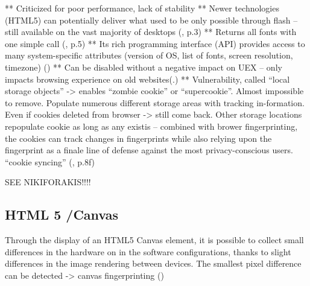 **	Criticized for poor performance, lack of stability
**	Newer technologies (HTML5) can potentially deliver what used to be only possible through flash – still available on the vast majority of desktops (\textcite{nikiforakis13}, p.3)
**	Returns all fonts with one simple call (\textcite{havens16}, p.5)
**	Its rich programming interface (API) provides access to many system-specific attributes (version of OS, list of fonts, screen resolution, timezone) (\textcite{amiunique})
**	Can be disabled without a negative impact on UEX – only impacts browsing experience on old websites(\textcite{pixel18}.)
**	Vulnerability, called “local storage objects” -> enables “zombie cookie” or “supercookie”. Almost impossible to remove. Populate numerous different storage areas with tracking in-formation. Even if cookies deleted from browser -> still come back. Other storage locations repopulate cookie as long as any existis – combined with brower fingerprinting, the cookies can track changes in fingerprints while also relying upon the fingerprint as a finale line of defense against the most privacy-conscious users. “cookie syncing” (\textcite{havens16}, p.8f)

SEE NIKIFORAKIS!!!!

\subsection{HTML 5 /Canvas}
Through the display of an HTML5 Canvas element, it is possible to collect small differences in the hardware on in the software configurations, thanks to slight differences in the image rendering between devices. The smallest pixel difference can be detected -> canvas fingerprinting 
(\textcite{amiunique})

